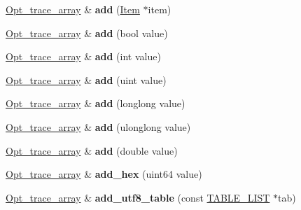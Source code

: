 \begin{DoxyCompactItemize}
\item 
\mbox{\label{classOpt__trace__array_a1cea9091b8e1173addcf3f728238cbf2}} 
\mbox{\hyperlink{classOpt__trace__array}{Opt\+\_\+trace\+\_\+array}} \& {\bfseries add} (\mbox{\hyperlink{classItem}{Item}} $\ast$item)
\item 
\mbox{\label{classOpt__trace__array_af0e782d883248b44bbefbf58f0fefbd8}} 
\mbox{\hyperlink{classOpt__trace__array}{Opt\+\_\+trace\+\_\+array}} \& {\bfseries add} (bool value)
\item 
\mbox{\label{classOpt__trace__array_af5d3cb65a0c4034a181b92a23b283bb5}} 
\mbox{\hyperlink{classOpt__trace__array}{Opt\+\_\+trace\+\_\+array}} \& {\bfseries add} (int value)
\item 
\mbox{\label{classOpt__trace__array_aa1b99c916565b9a504ccba56297ecef5}} 
\mbox{\hyperlink{classOpt__trace__array}{Opt\+\_\+trace\+\_\+array}} \& {\bfseries add} (uint value)
\item 
\mbox{\label{classOpt__trace__array_aab1484a18929323f5663b0ed68510fa8}} 
\mbox{\hyperlink{classOpt__trace__array}{Opt\+\_\+trace\+\_\+array}} \& {\bfseries add} (longlong value)
\item 
\mbox{\label{classOpt__trace__array_a976b0fa9f129777a2e301c9db2d408bf}} 
\mbox{\hyperlink{classOpt__trace__array}{Opt\+\_\+trace\+\_\+array}} \& {\bfseries add} (ulonglong value)
\item 
\mbox{\label{classOpt__trace__array_a947ab2712c351906205315e9a1d62d40}} 
\mbox{\hyperlink{classOpt__trace__array}{Opt\+\_\+trace\+\_\+array}} \& {\bfseries add} (double value)
\item 
\mbox{\label{classOpt__trace__array_a12db6e840a8bb8f5acd8e4a822bfd0c1}} 
\mbox{\hyperlink{classOpt__trace__array}{Opt\+\_\+trace\+\_\+array}} \& {\bfseries add\+\_\+hex} (uint64 value)
\item 
\mbox{\label{classOpt__trace__array_a683c1639949270cf2ccec46e1ee54fc2}} 
\mbox{\hyperlink{classOpt__trace__array}{Opt\+\_\+trace\+\_\+array}} \& {\bfseries add\+\_\+utf8\+\_\+table} (const \mbox{\hyperlink{structTABLE__LIST}{T\+A\+B\+L\+E\+\_\+\+L\+I\+ST}} $\ast$tab)

\end{DoxyCompactItemize}
